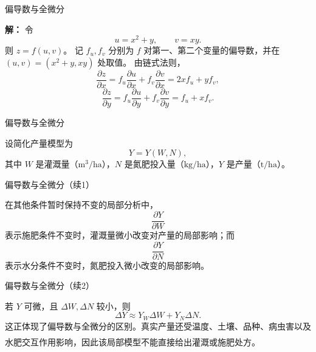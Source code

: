 \documentclass[aspectratio=169,10pt,fontset=fandol]{ctexbeamer}
\newcommand{\upcite}[1]{\textsuperscript{\textsuperscript{\cite{#1}}}}
\begin{document}
\begin{frame}[t,fragile]{偏导数与全微分}
\footnotesize
{\footnotesize
\textbf{解：}
令
\[
u=x^2+y,\qquad v=xy.
\]
则 $z=f(u,v)$。 记 $f_u,f_v$ 分别为 $f$ 对第一、第二个变量的偏导数，并在 $(u,v)=(x^2+y,xy)$ 处取值。 由链式法则，
\[
\frac{\partial z}{\partial x}
=f_u\frac{\partial u}{\partial x}+f_v\frac{\partial v}{\partial x}
=2x f_u+y f_v,
\]
\[
\frac{\partial z}{\partial y}
=f_u\frac{\partial u}{\partial y}+f_v\frac{\partial v}{\partial y}
=f_u+x f_v.
\]

}
\end{frame}
\begin{frame}[t,fragile]{偏导数与全微分}
\footnotesize
{\footnotesize
\begin{application}[作物产量对水分和氮肥的敏感性]
设简化产量模型为
\[
Y=Y(W,N),
\]
其中 $W$ 是灌溉量（$\mathrm{m^3/ha}$），$N$ 是氮肥投入量（$\mathrm{kg/ha}$），$Y$ 是产量（$\mathrm{t/ha}$）。
\end{application}
}
\end{frame}
\begin{frame}[t,fragile]{偏导数与全微分（续1）}
\footnotesize
{\footnotesize
\begin{application}[作物产量对水分和氮肥的敏感性]
在其他条件暂时保持不变的局部分析中，
\[
\frac{\partial Y}{\partial W}
\]
表示施肥条件不变时，灌溉量微小改变对产量的局部影响；而
\[
\frac{\partial Y}{\partial N}
\]
表示水分条件不变时，氮肥投入微小改变的局部影响。
\end{application}
}
\end{frame}
\begin{frame}[t,fragile]{偏导数与全微分（续2）}
\footnotesize
{\footnotesize
\begin{application}[作物产量对水分和氮肥的敏感性]
若 $Y$ 可微，且 $\Delta W,\Delta N$ 较小，则
\[
\Delta Y\approx Y_W\Delta W+Y_N\Delta N.
\]
这正体现了偏导数与全微分的区别。真实产量还受温度、土壤、品种、病虫害以及水肥交互作用影响，因此该局部模型不能直接给出灌溉或施肥处方。\upcite{TaizPlant}
\end{application}
}
\end{frame}
\end{document}
